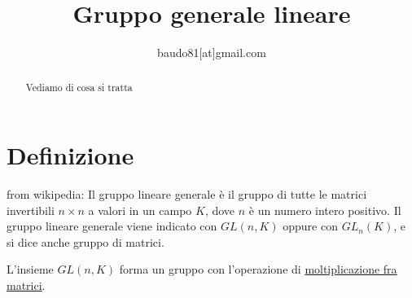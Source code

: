 \documentclass[a4paper,10pt]{article}
\title{Gruppo generale lineare}
\author{baudo81[at]gmail.com}
\begin{document}
\maketitle

\begin{abstract}
Vediamo di cosa si tratta
\end{abstract}

\section{Definizione}
from wikipedia:
Il gruppo lineare generale è il gruppo di tutte le matrici invertibili $n \times n$ 
a valori in un campo $K$, dove $n$ è un numero intero positivo. 
Il gruppo lineare generale viene indicato con $GL(n, K)$ oppure con $GL_{n}(K)$, e si dice anche gruppo di matrici.

L'insieme $GL(n, K)$ forma un gruppo con l'operazione di \href{./prodottoMatrici.html}{moltiplicazione fra matrici}.
\end{document}
